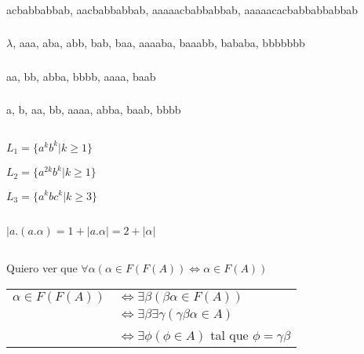 \subsubsection{}
acbabbabbab, aacbabbabbab, aaaaacbabbabbab, aaaaacacbabbabbabbab

\subsubsection{}
$\lambda$, aaa, aba, abb, bab, baa, aaaaba, baaabb, bababa, bbbbbbb

\subsubsection{}
aa, bb, abba, bbbb, aaaa, baab

\subsubsection{}
a, b, aa, bb, aaaa, abba, baab, bbbb

\subsection{}
$L_1 = \{a^kb^k | k \geq 1\}$

$L_2 = \{a^{2k}b^k | k \geq 1\}$

$L_3 = \{a^kbc^k | k \geq 3\}$

\subsection{}
\subsubsection{}
$|a . (a . \alpha) = 1 + |a . \alpha| = 2 + |\alpha|$

\subsection{}
\subsubsection{}
Quiero ver que $\forall \alpha (\alpha \in F(F(A)) \Leftrightarrow \alpha \in F(A))$

\begin{tabular}{l l}
    $\alpha \in F(F(A))$ & $ \Leftrightarrow \exists \beta (\beta \alpha \in F(A)) $ \\
                         & $ \Leftrightarrow \exists \beta \exists \gamma (\gamma \beta \alpha \in A) $ \\
                         & $ \Leftrightarrow \exists \phi (\phi \in A)$ tal que $\phi = \gamma \beta $ \\
\end{tabular}

